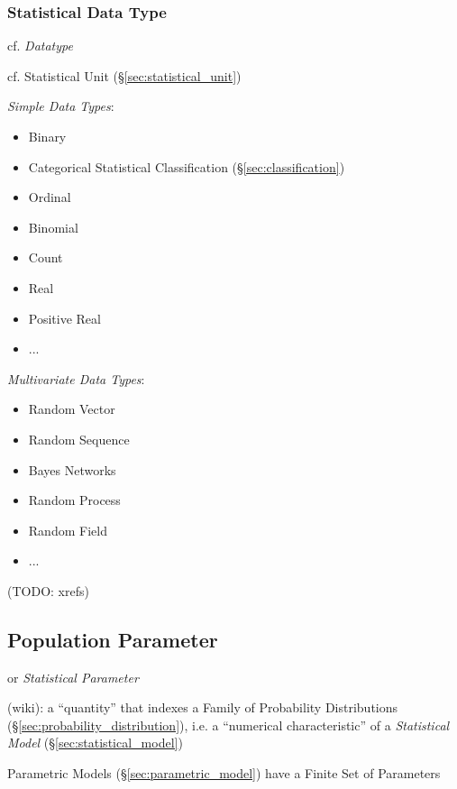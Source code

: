\subsubsection{Statistical Data Type}\label{sec:statistical_data_type}

\fist cf. \emph{Datatype}

cf. Statistical Unit (\S\ref{sec:statistical_unit})

\emph{Simple Data Types}:
\begin{itemize}
  \item Binary
  \item Categorical
    \fist Statistical Classification (\S\ref{sec:classification})
  \item Ordinal
  \item Binomial
  \item Count
  \item Real
  \item Positive Real
  \item ...
\end{itemize}

\emph{Multivariate Data Types}:
\begin{itemize}
  \item Random Vector
  \item Random Sequence
  \item Bayes Networks
  \item Random Process
  \item Random Field
  \item ...
\end{itemize}

(TODO: xrefs)



\subsection{Population Parameter}\label{sec:population_parameter}

or \emph{Statistical Parameter}

(wiki): a ``quantity'' that indexes a Family of Probability Distributions
(\S\ref{sec:probability_distribution}), i.e. a ``numerical characteristic'' of a
\emph{Statistical Model} (\S\ref{sec:statistical_model})

Parametric Models (\S\ref{sec:parametric_model}) have a Finite Set of Parameters

